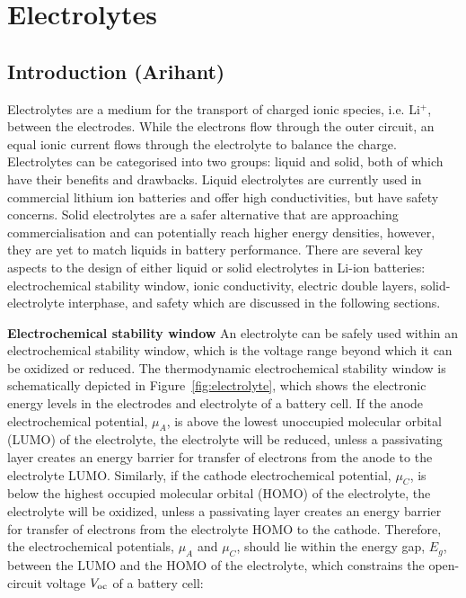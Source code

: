 \documentclass[../main.tex]{subfiles}
\begin{document}
\section{Electrolytes}
\label{sec:electrolytes}
\subsection{Introduction (Arihant)}
\label{sec:electrolytes_introduction}
Electrolytes are a medium for the transport of charged ionic species, i.e. Li$^+$, between the electrodes.\cite{Schmickler2010,Bard2010} While the electrons flow through the outer circuit, an equal ionic current flows through the electrolyte to balance the charge. Electrolytes can be categorised into two groups: liquid and solid, both of which have their benefits and drawbacks. Liquid electrolytes are currently used in commercial lithium ion batteries and offer high conductivities, but have safety concerns. Solid electrolytes are a safer alternative that are approaching commercialisation and can potentially reach higher energy densities, however, they are yet to match liquids in battery performance. There are several key aspects to the design of either liquid or solid electrolytes in Li-ion batteries: electrochemical stability window, ionic conductivity, electric double layers, solid-electrolyte interphase, and safety which are discussed in the following sections.\cite{Xu2004,Xu2014}


\textbf{Electrochemical stability window} An electrolyte can be safely used within an electrochemical stability window, which is the voltage range beyond which it can be oxidized or reduced.\cite{Goodenough2010} The thermodynamic electrochemical stability window is schematically depicted in Figure~\ref{fig:electrolyte}, which shows the electronic energy levels in the electrodes and electrolyte of a battery cell. If the anode electrochemical potential, $\mu_{A}$, is above the lowest unoccupied molecular orbital (LUMO) of the electrolyte, the electrolyte will be reduced, unless a passivating layer creates an energy barrier for transfer of electrons from the anode to the electrolyte LUMO. Similarly, if the cathode electrochemical potential, $\mu_{C}$, is below the highest occupied molecular orbital (HOMO) of the electrolyte, the electrolyte will be oxidized, unless a passivating layer creates an energy barrier for transfer of electrons from the electrolyte HOMO to the cathode. Therefore, the electrochemical potentials, $\mu_{A}$ and $\mu_{C}$, should lie within the energy gap, $E_g$, between the LUMO and the HOMO of the electrolyte, which constrains the open-circuit voltage $V_{\rm oc}$ of a battery cell:\cite{Goodenough2010}
\end{document}
